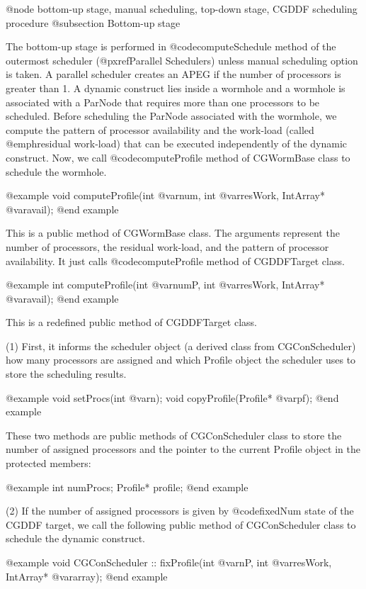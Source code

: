{@node bottom-up stage, manual scheduling, top-down stage, CGDDF scheduling procedure
@subsection Bottom-up stage

The bottom-up stage is performed in @code{computeSchedule} method of
the outermost scheduler (@pxref{Parallel Schedulers}) unless
manual scheduling option is taken. A parallel scheduler
creates an APEG if the number of processors is greater than 1. A dynamic
construct lies inside a wormhole and a wormhole is associated with a
ParNode that requires more than one processors to be scheduled. Before
scheduling the ParNode associated with the wormhole, we compute the
pattern of processor availability and the work-load (called
@emph{residual} work-load) that can be
executed independently of the dynamic construct. Now, we call
@code{computeProfile} method of CGWormBase class to schedule the wormhole.

@example
void computeProfile(int @var{num}, int @var{resWork}, IntArray* @var{avail});
@end example

This is a public method of CGWormBase class. The arguments represent the
number of processors, the residual work-load, and the pattern of processor
availability. It just calls @code{computeProfile} method of CGDDFTarget class.

@example
int computeProfile(int @var{numP}, int @var{resWork}, IntArray* @var{avail});
@end example

This is a redefined public method of CGDDFTarget class. 

(1) First, it informs the
scheduler object (a derived class from CGConScheduler) how many processors
are assigned and which Profile object the scheduler uses to store the
scheduling results.

@example
void setProcs(int @var{n});
void copyProfile(Profile* @var{pf});
@end example

These two methods are public methods of CGConScheduler class to store the
number of assigned processors and the pointer to the current Profile object
in the protected members:

@example
int numProcs;
Profile* profile;
@end example

(2) If the number of assigned processors is given by @code{fixedNum} state
of the CGDDF target, we call the following public method of
CGConScheduler class to schedule the dynamic construct.

@example
void CGConScheduler :: fixProfile(int @var{nP}, int @var{resWork}, IntArray* @var{array});
@end example

}
